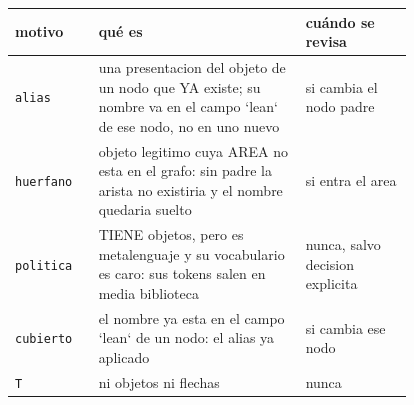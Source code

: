 \documentclass[10pt,a4paper]{article}
\begin{document}
\noindent\small\begin{tabular}{@{}l>{\raggedright\arraybackslash}p{0.52\linewidth}>{\raggedright\arraybackslash}p{0.27\linewidth}@{}}\toprule
motivo & qué es & cuándo se revisa\\\midrule
\texttt{alias} & una presentacion del objeto de un nodo que YA existe; su nombre va en el campo `lean` de ese nodo, no en uno nuevo & si cambia el nodo padre\\
\texttt{huerfano} & objeto legitimo cuya AREA no esta en el grafo: sin padre la arista no existiria y el nombre quedaria suelto & si entra el area\\
\texttt{politica} & TIENE objetos, pero es metalenguaje y su vocabulario es caro: sus tokens salen en media biblioteca & nunca, salvo decision explicita\\
\texttt{cubierto} & el nombre ya esta en el campo `lean` de un nodo: el alias ya aplicado & si cambia ese nodo\\
\texttt{T} & ni objetos ni flechas & nunca\\
\bottomrule\end{tabular}\par\medskip
\end{document}
